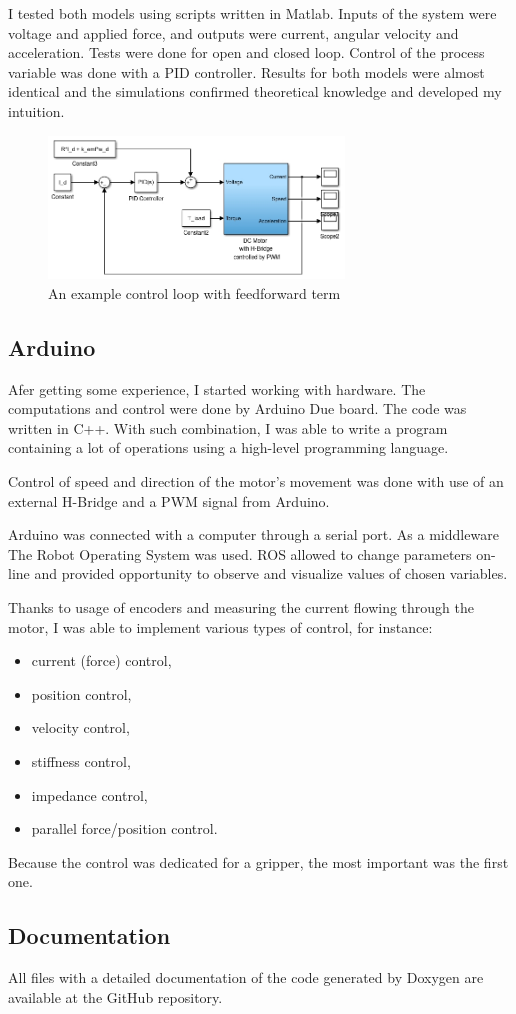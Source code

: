 I tested both models using scripts written in Matlab. Inputs of the system were voltage and applied force, and outputs were current, angular velocity and acceleration. Tests were done for open and closed loop. Control of the process variable was done with a PID controller. Results for both models were almost identical and the simulations confirmed theoretical knowledge and developed my intuition.

\begin{figure}%
 \begin{center} 
  \includegraphics[width=0.7\textwidth]{./stuff/control_loop}
 \end{center}
 \caption{An example control loop with feedforward term}
 \label{fig:loop} 
\end{figure} 

\subsection{Arduino}
Afer getting some experience, I started working with hardware. The computations and control were done by \textsf{Arduino Due} board. The code was written in \textsf{C++}. With such combination, I was able to write a program containing a lot of operations using a high-level programming language.

Control of speed and direction of the motor's movement was done with use of an external H-Bridge and a PWM signal from \textsf{Arduino}.

Arduino was connected with a computer through a serial port. As a middleware \textsf{The Robot Operating System} was used. \textsf{ROS} allowed to change parameters on-line and provided opportunity to observe and visualize values of chosen variables.

Thanks to usage of encoders and measuring the current flowing through the motor, I was able to implement various types of control, for instance:
\begin{itemize}
	\item current (force) control,
	\item position control,
	\item velocity control,
	\item stiffness control,
	\item impedance control,
	\item parallel force/position control.
\end{itemize}  

Because the control was dedicated for a gripper, the most important was the first one.

\subsection{Documentation}
All files with a detailed documentation of the code generated by \textsf{Doxygen} are available at the \textsf{GitHub} repository.